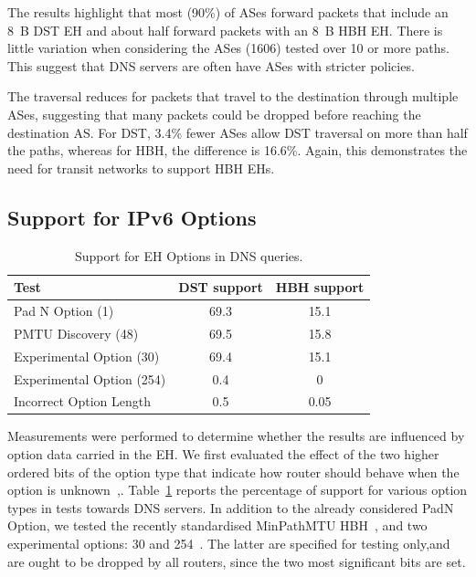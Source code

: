 \documentclass[conference]{IEEEtran}
\begin{document}

The results highlight that most (90\%) of ASes forward packets that include an  8~B DST EH
 and about half forward packets with an
8~B HBH EH.  There is little variation when considering the ASes (1606) tested over 10 or more paths.  
This suggest that DNS servers are often have
ASes with stricter policies.

The traversal reduces for packets that travel to the destination
through multiple ASes, suggesting that many packets  could be
dropped before reaching the destination AS. For DST, 3.4\% fewer ASes
allow DST traversal on more than half the paths, whereas for HBH, the
difference is 16.6\%. Again, this demonstrates the need for  transit 
networks to support HBH EHs. 

\subsection{Support for IPv6 Options}

\begin{table}[t]
\centering 
\caption{Support for EH Options in DNS queries.}
\begin{tabular}{l|c|c}
Test                      & DST support & HBH support\\
\hline \hline
Pad N Option (1)          & 69.3        & 15.1       \\
PMTU Discovery (48)       & 69.5        & 15.8       \\
Experimental Option (30)  & 69.4        & 15.1       \\
Experimental Option (254) & 0.4         & 0          \\
Incorrect Option Length   & 0.5         & 0.05            
\end{tabular}
\label{tbl:option_type_support}
\end{table}

Measurements were performed to determine whether the results are 
influenced by option data carried in the EH.  We first
evaluated the effect of the two higher ordered bits of the option type
that indicate how router should behave when the option is unknown~\cite{rfc8200},.
Table~\ref{tbl:option_type_support} reports the percentage of support for various
option types in tests towards DNS servers.  In addition to the already
considered PadN Option, we tested the recently standardised MinPathMTU
HBH~\cite{rfc9268}, and two experimental options: 30 and
254~\cite{RFC4727}.  The latter are specified for testing
only,and are ought to be dropped by all routers, since the two most
significant bits are set.  
\end{document}
